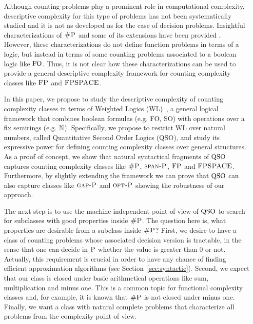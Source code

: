 Although counting problems play a prominent role in computational complexity, descriptive complexity for this type of problems has not been systematically studied and it is not as developed as for the case of decision problems. Insightful characterizations of $\text{\sc \#P}$ and some of its extensions have been provided \cite{SalujaST95,ComptonG96}. However, these characterizations do not define function problems in terms of a logic, but instead in terms of some counting problems associated to a boolean logic like ${\rm FO}$. Thus, it is not clear how these characterizations can be used to provide a general descriptive complexity framework for counting complexity classes like $\text{\sc FP}$ and $\text{\sc FPSPACE}$.

In this paper, we propose to study the descriptive complexity of counting complexity classes in terms of Weighted Logics (WL)~\cite{DrosteG07}, a general logical framework that combines boolean formulas (e.g. FO, SO) with operations over a fix semirings (e.g. $\mathbb{N}$). 
Specifically, we propose to restrict WL over natural numbers, called Quantitative Second Order Logics (QSO), and study its expressive power for defining counting complexity classes over general structures. 
As a proof of concept, we show that natural syntactical fragments of ${\rm QSO}$ captures counting complexity classes like $\text{\sc \#P}$, $\text{\sc span-P}$, $\text{\sc FP}$ and $\text{\sc FPSPACE}$.
Furthermore, by slightly extending the framework we can prove that ${\rm QSO}$ can also capture classes like $\text{\sc gap-P}$ and $\text{\sc opt-P}$ showing the robustness of our approach.

The next step is to use the machine-independent point of view of ${\rm QSO}$ to search for subclasses with good properties inside $\text{\sc \#P}$. 
The question here is, what properties are desirable from a subclass inside $\text{\sc \#P}$?
First, we desire to have a class of counting problems whose associated decision version is tractable, in the sense that one can decide in $\text{\sc P}$ whether the value is greater than $0$ or not. 
Actually, this requirement is crucial in order to have any chance of finding efficient approximation algorithms (see Section~\ref{sec:syntactic}).
Second, we expect that our class is closed under basic arithmetical operations like sum, multiplication and minus one. 
This is a common topic for functional complexity classes and, for example, it is known that $\text{\sc \#P}$ is not closed under minus one. 
Finally, we want a class with natural complete problems that characterize all problems from the complexity point of view.

